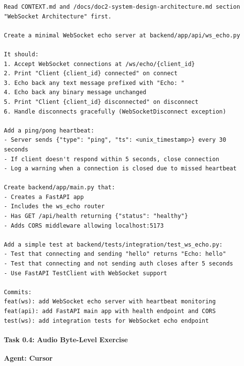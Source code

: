 \documentclass[
  11pt,
]{article}
\begin{document}
\begin{lstlisting}
Read CONTEXT.md and /docs/doc2-system-design-architecture.md section "WebSocket Architecture" first.

Create a minimal WebSocket echo server at backend/app/api/ws_echo.py

It should:
1. Accept WebSocket connections at /ws/echo/{client_id}
2. Print "Client {client_id} connected" on connect
3. Echo back any text message prefixed with "Echo: "
4. Echo back any binary message unchanged
5. Print "Client {client_id} disconnected" on disconnect
6. Handle disconnects gracefully (WebSocketDisconnect exception)

Add a ping/pong heartbeat:
- Server sends {"type": "ping", "ts": <unix_timestamp>} every 30 seconds
- If client doesn't respond within 5 seconds, close connection
- Log a warning when a connection is closed due to missed heartbeat

Create backend/app/main.py that:
- Creates a FastAPI app
- Includes the ws_echo router
- Has GET /api/health returning {"status": "healthy"}
- Adds CORS middleware allowing localhost:5173

Add a simple test at backend/tests/integration/test_ws_echo.py:
- Test that connecting and sending "hello" returns "Echo: hello"
- Test that connecting and not sending auth closes after 5 seconds
- Use FastAPI TestClient with WebSocket support

Commits:
feat(ws): add WebSocket echo server with heartbeat monitoring
feat(api): add FastAPI main app with health endpoint and CORS
test(ws): add integration tests for WebSocket echo endpoint
\end{lstlisting}

\hypertarget{task-0.4-audio-byte-level-exercise}{%
\paragraph{Task 0.4: Audio Byte-Level
Exercise}\label{task-0.4-audio-byte-level-exercise}}

\textbf{Agent: Cursor}
\end{document}
